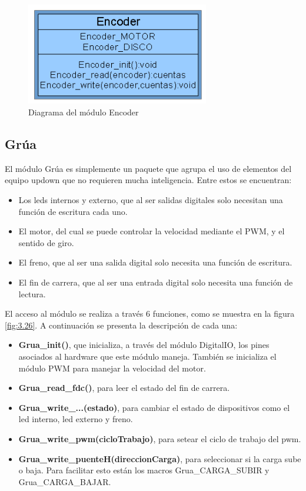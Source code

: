 \begin{figure}[!ht]
	\centering
	\includegraphics[width=8cm,scale=1]{resources/3_25-moduloEncoder.png}
	\caption{Diagrama del módulo Encoder}
	\label{fig:\thefigure}
\end{figure}


\subsection{Grúa}
El módulo Grúa es simplemente un paquete que agrupa el uso de elementos del equipo updown que no requieren mucha inteligencia. Entre estos se encuentran: 
\begin{itemize}
	\item Los leds internos y externo, que al ser salidas digitales solo necesitan una función de escritura cada uno.
	\item El motor, del cual se puede controlar la velocidad mediante el PWM, y el sentido de giro.
	\item El freno, que al ser una salida digital solo necesita una función de escritura.
	\item El fin de carrera, que al ser una entrada digital solo necesita una función de lectura.
\end{itemize} 

El acceso al módulo se realiza a través 6 funciones, como se muestra en la figura \ref{fig:3.26}. A continuación se presenta la descripción de cada una:
\begin{itemize}
	\item \textbf{Grua\_init()}, que inicializa, a través del módulo DigitalIO, los pines asociados al hardware que este módulo maneja. También se inicializa el módulo PWM para manejar la velocidad del motor.
	\item \textbf{Grua\_read\_fdc()}, para leer el estado del fin de carrera.
	\item \textbf{Grua\_write\_...(estado)}, para cambiar el estado de dispositivos como el led interno, led externo y freno.
	\item \textbf{Grua\_write\_pwm(cicloTrabajo)}, para setear el ciclo de trabajo del pwm.
	\item \textbf{Grua\_write\_puenteH(direccionCarga)}, para seleccionar si la carga sube o baja. Para facilitar esto están los macros Grua\_CARGA\_SUBIR y Grua\_CARGA\_BAJAR.
\end{itemize}

